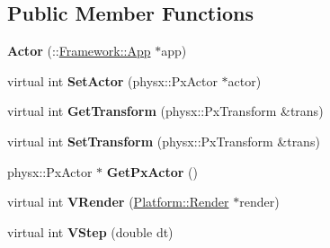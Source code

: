 \subsection*{Public Member Functions}
\begin{DoxyCompactItemize}
\item 
\hypertarget{classContent_1_1Actor_a78a500d2bf46938fd19b855736663ef1}{
{\bfseries Actor} (::\hyperlink{classFramework_1_1App}{Framework::App} $\ast$app)}
\label{classContent_1_1Actor_a78a500d2bf46938fd19b855736663ef1}

\item 
\hypertarget{classContent_1_1Actor_a3bf34ce11c7eb362f5a0ea24ebda838c}{
virtual int {\bfseries SetActor} (physx::PxActor $\ast$actor)}
\label{classContent_1_1Actor_a3bf34ce11c7eb362f5a0ea24ebda838c}

\item 
\hypertarget{classContent_1_1Actor_a74c01139c24631282fa8303680f23725}{
virtual int {\bfseries GetTransform} (physx::PxTransform \&trans)}
\label{classContent_1_1Actor_a74c01139c24631282fa8303680f23725}

\item 
\hypertarget{classContent_1_1Actor_a94bef7fd7a78042c4b8dc7445deb7002}{
virtual int {\bfseries SetTransform} (physx::PxTransform \&trans)}
\label{classContent_1_1Actor_a94bef7fd7a78042c4b8dc7445deb7002}

\item 
\hypertarget{classContent_1_1Actor_ae6c64f5aff7cf9aac0854ea44ba7d382}{
physx::PxActor $\ast$ {\bfseries GetPxActor} ()}
\label{classContent_1_1Actor_ae6c64f5aff7cf9aac0854ea44ba7d382}

\item 
\hypertarget{classContent_1_1Actor_aaf21cc2520beb944201d410da54e5f11}{
virtual int {\bfseries VRender} (\hyperlink{classPlatform_1_1Render}{Platform::Render} $\ast$render)}
\label{classContent_1_1Actor_aaf21cc2520beb944201d410da54e5f11}

\item 
\hypertarget{classContent_1_1Actor_a9ff1a1c741b71dc811abf35c9d68fced}{
virtual int {\bfseries VStep} (double dt)}
\label{classContent_1_1Actor_a9ff1a1c741b71dc811abf35c9d68fced}

\end{DoxyCompactItemize}

